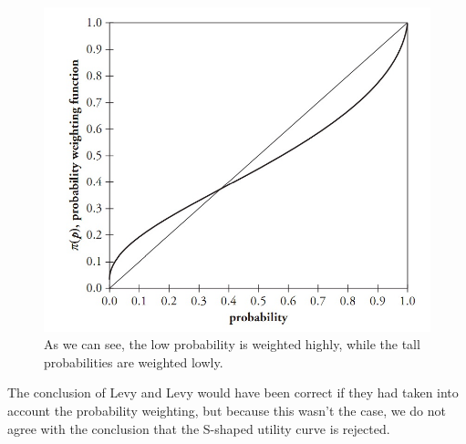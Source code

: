 \documentclass[11pt]{article}
\begin{document}
		\begin{figure}[ht] 
		\includegraphics{WeightedProbability.jpg}
		\caption{As we can see, the low probability is weighted highly, while the tall probabilities are weighted lowly.}
		\end{figure}
	

	
	The conclusion of Levy and Levy would have been correct if they had taken into account the probability weighting, but because this wasn’t the case, we do not agree with the conclusion that the S-shaped utility curve is rejected.
	
\end{document}
